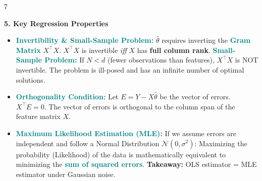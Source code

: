 \documentclass{article}
\newcommand{\hlhighlight}[1]{\par\vspace{1.5pt}\noindent\colorbox{yellow!50}{\parbox{\dimexpr\columnwidth-2\fboxsep\relax}{\textbf{#1}}}\par\vspace{0.5pt}}
\newcommand{\sectitle}[1]{\par\textbf{\color{blue!70!black}{#1}}\par}
\newcommand{\concept}[1]{\textcolor{teal}{\textbf{#1}}}
\newcommand{\lbl}[1]{\textcolor{green!60!black}{\textbf{#1}}}
\begin{document}
\begin{multicols}{7}
\hlhighlight{5. Key Regression Properties}
\sectitle{Core Concepts}
\begin{itemize}
    \item \concept{Invertibility \& Small-Sample Problem:} $\hat{\theta}$ requires inverting the \concept{Gram Matrix} $X^\top X$. $X^\top X$ is invertible \textit{iff} $X$ has \lbl{full column rank}. \concept{Small-Sample Problem:} If $N < d$ (fewer observations than features), $X^\top X$ is NOT invertible. The problem is ill-posed and has an infinite number of optimal solutions.
    \item \concept{Orthogonality Condition:} Let $E = Y - X\hat{\theta}$ be the vector of errors. $X^\top E = 0$. The vector of errors is orthogonal to the column span of the feature matrix $X$.
    \item \concept{Maximum Likelihood Estimation (MLE):} If we assume errors are independent and follow a Normal Distribution $\mathcal{N}(0, \sigma^2)$: Maximizing the probability (Likelihood) of the data is mathematically equivalent to minimizing the \concept{sum of squared errors}. \lbl{Takeaway:} OLS estimator = MLE estimator under Gaussian noise.
\end{itemize}


\end{multicols}
\end{document}
